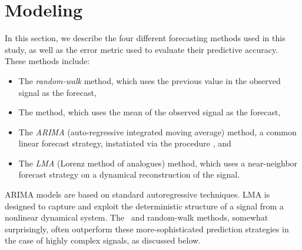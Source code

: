\section{Modeling }\label{sec:model}
%
%
%
%

In this section, we describe the four different forecasting methods
used in this study, as well as the error metric used to evaluate their
predictive accuracy.  These methods include:
\begin{itemize}
\item The \emph{random-walk} method, which uses the previous value in
  the observed signal as the forecast,

\item The \emph{\naive} method, which uses the mean of the
  observed signal as the forecast,

\item The \emph{ARIMA} (auto-regressive integrated moving average)
  method, a common linear forecast strategy, instatiated via the
  \emph{\arima} procedure \cite{autoARIMA}, and

\item The \emph{LMA} (Lorenz method of analogues) method, which uses a
  near-neighbor forecast strategy on a dynamical reconstruction of the
  signal.
\end{itemize}
ARIMA models are based on standard autoregressive techniques.  LMA is
designed to capture and exploit the deterministic structure of a
signal from a nonlinear dynamical system.  The \naive ~and random-walk
methods, somewhat surprisingly, often outperform these
more-sophisticated prediction strategies in the case of highly complex
signals, as discussed below.

